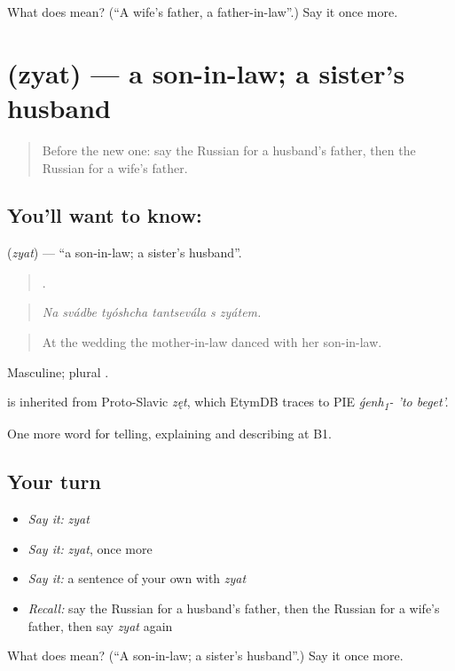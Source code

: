\begin{tcolorbox}[breakable,colback=teal!4,colframe=teal!35!black,title={Before you move on}]
What does  mean? (\textquotedblleft{}A wife's father, a father-in-law\textquotedblright{}.) Say it once more.
\end{tcolorbox}
\section[\texorpdfstring{\ru{зять} (zyat)}{зять (zyat)}]{ (zyat) — a son-in-law; a sister's husband}

\label{lesson:RU-C491-zyat}



\begin{quote}
Before the new one: say the Russian for a husband's father, then the Russian for a wife's father.
\end{quote}

\subsection*{You'll want to know: }
\textbf{} (\emph{zyat}) — \textquotedblleft{}a son-in-law; a sister's husband\textquotedblright{}.

\begin{quote}
     .
\end{quote}

\begin{quote}
\emph{Na svádbe tyóshcha tantsevála s zyátem.}
\end{quote}

\begin{quote}
At the wedding the mother-in-law danced with her son-in-law.
\end{quote}

Masculine; plural .

\begin{cousinweb}
\emph{} is inherited from Proto-Slavic \emph{zęt}, which EtymDB traces to PIE \emph{ǵenh\textsubscript{1}- 'to beget'.}
\end{cousinweb}

\begin{grammarlens}[title={What you've built}]
One more word for telling, explaining and describing at B1.
\end{grammarlens}

\subsection*{Your turn}
\begin{itemize}
\raggedright
  \item \emph{Say it:} \emph{zyat}
  \item \emph{Say it:} \emph{zyat}, once more
  \item \emph{Say it:} a sentence of your own with \emph{zyat}
  \item \emph{Recall:} say the Russian for a husband's father, then the Russian for a wife's father, then say \emph{zyat} again
\end{itemize}

\begin{tcolorbox}[breakable,colback=teal!4,colframe=teal!35!black,title={Before you move on}]
What does  mean? (\textquotedblleft{}A son-in-law; a sister's husband\textquotedblright{}.) Say it once more.
\end{tcolorbox}
